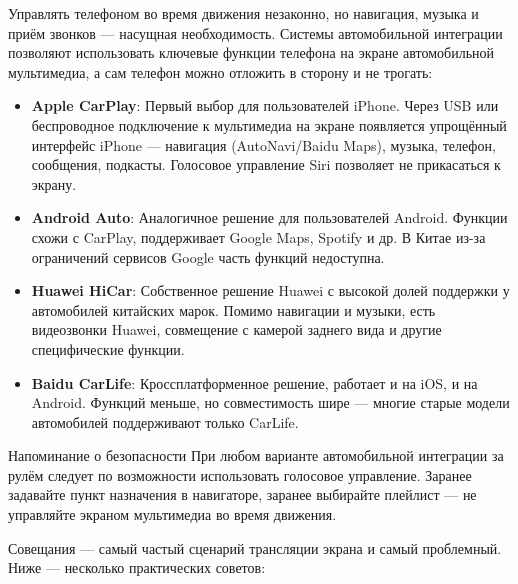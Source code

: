 
Управлять телефоном во время движения незаконно, но навигация, музыка и приём звонков — насущная необходимость. Системы автомобильной интеграции позволяют использовать ключевые функции телефона на экране автомобильной мультимедиа, а сам телефон можно отложить в сторону и не трогать:

\begin{itemize}
  \item \textbf{Apple CarPlay}: Первый выбор для пользователей iPhone. Через USB или беспроводное подключение к мультимедиа на экране появляется упрощённый интерфейс iPhone — навигация (AutoNavi/Baidu Maps), музыка, телефон, сообщения, подкасты. Голосовое управление Siri позволяет не прикасаться к экрану.
  \item \textbf{Android Auto}: Аналогичное решение для пользователей Android. Функции схожи с CarPlay, поддерживает Google Maps, Spotify и др. В Китае из-за ограничений сервисов Google часть функций недоступна.
  \item \textbf{Huawei HiCar}: Собственное решение Huawei с высокой долей поддержки у автомобилей китайских марок. Помимо навигации и музыки, есть видеозвонки Huawei, совмещение с камерой заднего вида и другие специфические функции.
  \item \textbf{Baidu CarLife}: Кроссплатформенное решение, работает и на iOS, и на Android. Функций меньше, но совместимость шире — многие старые модели автомобилей поддерживают только CarLife.
\end{itemize}

\begin{tcbwarn}{Напоминание о безопасности}
При любом варианте автомобильной интеграции за рулём следует по возможности использовать голосовое управление. Заранее задавайте пункт назначения в навигаторе, заранее выбирайте плейлист — не управляйте экраном мультимедиа во время движения.

\end{tcbwarn}


Совещания — самый частый сценарий трансляции экрана и самый проблемный. Ниже — несколько практических советов:

